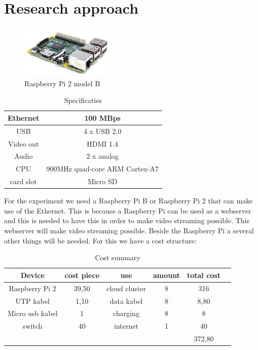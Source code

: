 \documentclass{sig-alternate-br}
\begin{document}
\section{Research approach}
\begin{figure}[H]
	\centering 
	\includegraphics[width=0.4\textwidth]{Pi2ModB1GB_-comp.jpeg}
	\caption{Raspberry Pi 2 model B}
	\label{fig:raspberry} %
\end{figure}
\begin{table}[H]
	\centering \caption{Specificaties}
	\begin{tabular}{|c|c|} \hline
		Ethernet & 100 MBps \\ \hline
		USB & 4 x USB 2.0 \\ \hline
		Video out & HDMI 1.4 \\ \hline
		Audio & 2 x analog \\ \hline
		CPU & 900MHz quad-core ARM Cortex-A7 \\ \hline
		card slot & Micro SD  \\ \hline
	\end{tabular}
	\label{tab:Specificaties}
\end{table}
For the experiment we need a Raspberry Pi B or Raspberry Pi 2 that can make use of the Ethernet. This is because a Raspberry Pi can be used as a webserver and this is needed to have this in order to make video streaming possible. This webserver will make video streaming possible. Beside the Raspberry Pi a several other things will be needed. For this we have a cost structure:
\begin{table}[H]
	\centering 
	\caption{Cost summary \cite{iapc}}
	\begin{tabular}{|c|c|c|c|c|c} \hline
		Device & cost piece& use & amount & total cost \\ \hline
		Raspberry 
		Pi 2 & 39,50 & cloud cluster & 8 & 316  \\ \hline
		UTP kabel & 1,10 & data kabel & 8 & 8,80  \\ \hline
		Micro usb kabel&1 & charging & 8 & 8  \\ \hline
		switch & 40 & internet & 1 & 40  \\ \hline
		& & & &  372,80  \\ \hline
	\end{tabular}
	\label{tab:cost}
\end{table}
\end{document}
